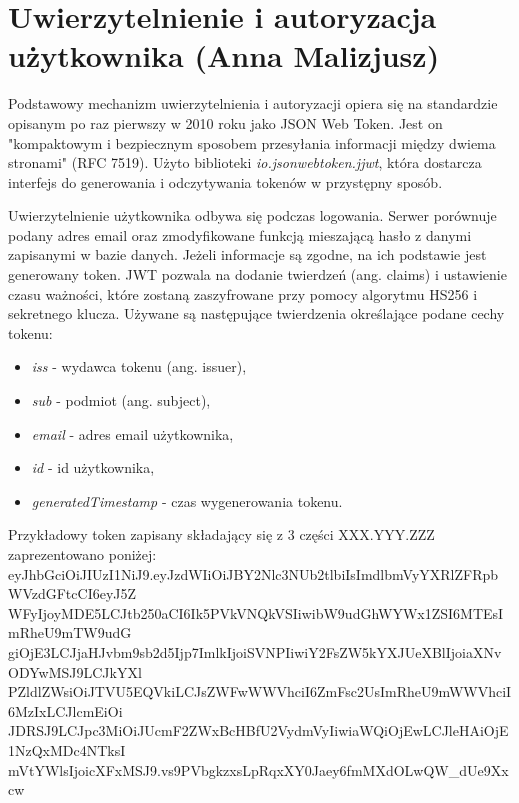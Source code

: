 \documentclass[10pt,twoside,a4paper]{report}
\begin{document}
\section{Uwierzytelnienie i autoryzacja użytkownika (Anna Malizjusz)}
\par Podstawowy mechanizm uwierzytelnienia i autoryzacji opiera się na standardzie opisanym po raz pierwszy w 2010 roku jako JSON Web Token. Jest on "kompaktowym i bezpiecznym sposobem przesyłania informacji między dwiema stronami" (RFC 7519\cite{JWT}). Użyto biblioteki \textit{io.jsonwebtoken.jjwt}\cite{JWT library}, która dostarcza interfejs do generowania i odczytywania tokenów w przystępny sposób.

\par Uwierzytelnienie użytkownika odbywa się podczas logowania. Serwer porównuje podany adres email oraz zmodyfikowane funkcją mieszającą hasło z danymi zapisanymi w bazie danych. Jeżeli informacje są zgodne, na ich podstawie jest generowany token. JWT pozwala na dodanie twierdzeń (ang. claims) i ustawienie czasu ważności, które zostaną zaszyfrowane przy pomocy algorytmu HS256 i sekretnego klucza. Używane są następujące twierdzenia określające podane cechy tokenu:
\begin{itemize}
\item \textit{iss} - wydawca tokenu (ang. issuer),
\item \textit{sub} - podmiot (ang. subject),
\item \textit{email} - adres email użytkownika,
\item \textit{id} - id użytkownika,
\item \textit{generatedTimestamp} - czas wygenerowania tokenu.
\end{itemize}
\par Przykładowy token zapisany składający się z 3 części XXX.YYY.ZZZ zaprezentowano poniżej:\\eyJhbGciOiJIUzI1NiJ9.eyJzdWIiOiJBY2Nlc3NUb2tlbiIsImdlbmVyYXRlZFRpbWVzdGFtcCI6eyJ5Z\\WFyIjoyMDE5LCJtb250aCI6Ik5PVkVNQkVSIiwibW9udGhWYWx1ZSI6MTEsImRheU9mTW9udG\\
giOjE3LCJjaHJvbm9sb2d5Ijp7ImlkIjoiSVNPIiwiY2FsZW5kYXJUeXBlIjoiaXNvODYwMSJ9LCJkYXl\\
PZldlZWsiOiJTVU5EQVkiLCJsZWFwWWVhciI6ZmFsc2UsImRheU9mWWVhciI6MzIxLCJlcmEiOi\\
JDRSJ9LCJpc3MiOiJUcmF2ZWxBcHBfU2VydmVyIiwiaWQiOjEwLCJleHAiOjE1NzQxMDc4NTksI\\mVtYWlsIjoicXFxMSJ9.vs9PVbgkzxsLpRqxXY0Jaey6fmMXdOLwQW\_dUe9Xxcw
\end{document}
